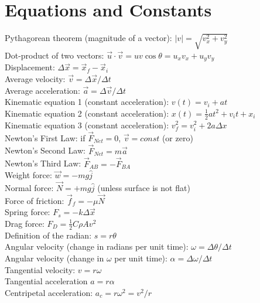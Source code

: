 \documentclass[10pt]{article}
\begin{document}
\maketitle
\small
\section{Equations and Constants}
Pythagorean theorem (magnitude of a vector): $|v| = \sqrt{v_x^2+v_y^2}$ \\
Dot-product of two vectors: $\vec{u} \cdot \vec{v} = uv\cos\theta = u_x v_x + u_y v_y$ \\
Displacement: $\Delta \vec{x} = \vec{x}_f - \vec{x}_i$ \\
Average velocity: $\vec{v} = \Delta \vec{x}/\Delta t$ \\
Average acceleration: $\vec{a} = \Delta \vec{v}/\Delta t$ \\
Kinematic equation 1 (constant acceleration): $v(t) = v_i + at$ \\
Kinematic equation 2 (constant acceleration): $x(t) = \frac{1}{2}at^2+v_i t+x_i$ \\
Kinematic equation 3 (constant acceleration): $v_f^2 = v_i^2 + 2 a \Delta x$ \\
Newton's First Law: if $\vec{F}_{Net} = 0$, $\vec{v} = const$ (or zero) \\
Newton's Second Law: $\vec{F}_{Net} = m \vec{a}$ \\
Newton's Third Law: $\vec{F}_{AB} = - \vec{F}_{BA}$ \\
Weight force: $\vec{w} = -mg\hat{j}$ \\
Normal force: $\vec{N} = +mg\hat{j}$ (unless surface is not flat) \\
Force of friction: $\vec{f}_f = -\mu \vec{N}$ \\
Spring force: $F_s = -k\Delta \vec{x}$ \\
Drag force: $F_D = \frac{1}{2}C\rho A v^2$ \\
Definition of the radian: $s = r \theta$ \\
Angular velocity (change in radians per unit time): $\omega = \Delta \theta/\Delta t$ \\
Angular velocity (change in $\omega$ per unit time): $\alpha = \Delta \omega/\Delta t$ \\
Tangential velocity: $v = r\omega$ \\
Tangential acceleration $a = r\alpha$ \\
Centripetal acceleration: $a_c = r\omega^2 = v^2/r$ \\
\end{document}
